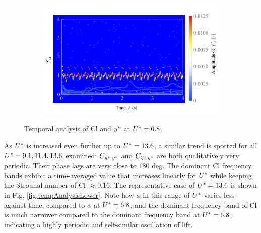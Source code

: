 \documentclass[oneside]{utmthesis}
\begin{document}
\begin{figure} \continuedfloat
  \centering
  \begin{subfigure}[h]{1\textwidth}
    \includegraphics[width=\textwidth]{figs/tempAnalysisUpper-c}
    \caption{}
    \label{fig:tempAnalysisUpper-c}
  \end{subfigure}
  \caption{Temporal analysis of Cl and $y^{*}$ at $U^{*} = 6.8$.} \label{fig:tempAnalysisUpper}
\end{figure}

As $U^{*}$ is increased even further up to $U^{*} = 13.6$, a similar trend is spotted for all $U^{*} = 9.1, 11.4, 13.6$ examined: $C_{y^{*},y^{*}}$ and $C_{\text{Cl},y^{*}}$ are both qualitatively very periodic. Their phase lags are very close to $180$ deg. The dominant Cl frequency bands exhibit a time-averaged value that increases linearly for $U^{*}$ while keeping the Strouhal number of Cl $\approx 0.16$. The representative case of $U^{*} = 13.6$ is shown in Fig. \ref{fig:tempAnalysisLower}. Note how $\phi$ in this range of $U^{*}$ varies less against time, compared to $\phi$ at $U^{*} = 6.8$, and the dominant frequency band of Cl is much narrower compared to the dominant frequency band at $U^{*} = 6.8$, indicating a highly periodic and self-similar oscillation of lift.
\end{document}
